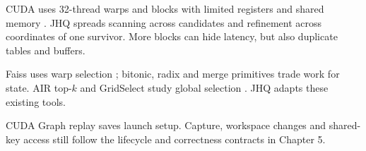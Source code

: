 CUDA uses 32-thread warps and blocks with limited registers and shared memory \cite{cuda_programming_guide}. JHQ spreads scanning across candidates and refinement across coordinates of one survivor. More blocks can hide latency, but also duplicate tables and buffers.

Faiss uses warp selection \cite{johnson_gpu}; bitonic, radix and merge primitives trade work for state. AIR top-$k$ and GridSelect study global selection \cite{gpu_topk}. JHQ adapts these existing tools.

CUDA Graph replay saves launch setup. Capture, workspace changes and shared-key access still follow the lifecycle and correctness contracts in Chapter 5.